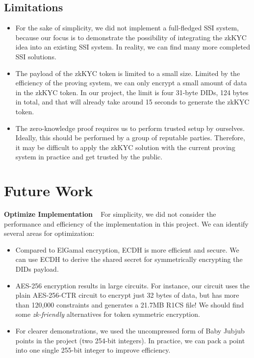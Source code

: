 \documentclass[
]{report}
\providecommand{\tightlist}{%
  \setlength{\itemsep}{0pt}\setlength{\parskip}{0pt}}
\begin{document}
\section{Limitations}

\begin{itemize}
\tightlist
\item
For the sake of simplicity, we did not implement a full-fledged SSI
system, because our focus is to demonstrate the possibility of
integrating the zkKYC idea into an existing SSI system. In reality,
we can find many more completed SSI solutions.
\item
The payload of the zkKYC token is limited to a small size. Limited by
the efficiency of the proving system, we can only encrypt a small
amount of data in the zkKYC token. In our project, the limit is
four 31-byte DIDs, 124 bytes in total, and that will already take
around 15 seconds to generate the zkKYC token.
\item
The zero-knowledge proof requires us to perform trusted setup by
ourselves. Ideally, this should be performed by a group of reputable
parties. Therefore, it may be difficult to apply the zkKYC solution
with the current proving system in practice and get trusted by the
public.
\end{itemize}

\chapter{Future Work}

\textbf{Optimize Implementation} ~ For simplicity, we did not consider
the performance and efficiency of the implementation in this project. We
can identify several areas for optimization:

\begin{itemize}
\tightlist
\item
  Compared to ElGamal encryption, ECDH is more efficient and secure. We
  can use ECDH to derive the shared secret for symmetrically encrypting
  the DIDs payload.
\item
  AES-256 encryption results in large circuits. For instance, our
  circuit uses the plain AES-256-CTR circuit to encrypt just 32 bytes of
  data, but has more than 120,000 constraints and generates a 21.7MB
  R1CS file! We should find some \emph{zk-friendly} alternatives for
  token symmetric encryption.
\item
  For clearer demonstrations, we used the uncompressed form of Baby
  Jubjub points in the project (two 254-bit integers). In practice, we
  can pack a point into one single 255-bit integer to improve
  efficiency.
\end{itemize}
\end{document}

